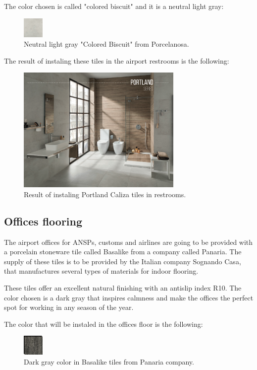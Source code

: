 	The color chosen is called "colored biscuit" and it is a neutral light gray:
			\begin{figure}[ht!]
	\centering
\includegraphics[width=1cm]{./images/Color3}
\caption{Neutral light gray "Colored Biscuit" from Porcelanosa.}
\end{figure}

The result of instaling these tiles in the airport restrooms is the following:

\begin{figure}[ht!]
	\centering
\includegraphics[width=8cm]{./images/Resultado3}
\caption{Result of instaling Portland Caliza tiles in restrooms.}
\end{figure}
	
		\subsection{Offices flooring}
	The airport offices for ANSPs, customs and airlines are going to be provided with a porcelain stoneware tile called Basalike from a company called Panaria. The supply of these tiles is to be provided by the Italian company Sognando Casa, that manufactures several types of materials for indoor flooring.
	
	These tiles offer an excellent natural finishing with an antislip index R10. The color chosen is a dark gray that inspires calmness and make the offices the perfect spot for working in any season of the year.
	
	The color that will be instaled in the offices floor is the following:
\begin{figure}[ht!]
\centering
\includegraphics[width=1cm]{./images/Color4}
\caption{Dark gray color in Basalike tiles from Panaria company.}
\end{figure}

